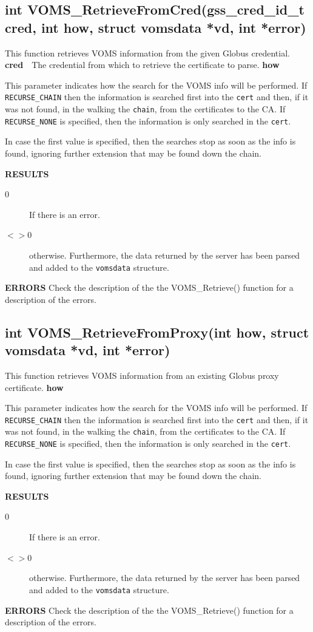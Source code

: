 \documentclass[a4paper]{book}
\newcommand{\errors}{\noindent \textbf{ERRORS}\newline}
\newcommand{\result}{\noindent \textbf{RESULTS}\newline}
\newcommand{\parameter}[1]{\newline\textbf{#1}\ \ }
\begin{document}
\subsection{int VOMS\_RetrieveFromCred(gss\_cred\_id\_t cred, int how, struct vomsdata
  *vd, int *error)}

This function retrieves VOMS information from the given Globus
credential.
\parameter{cred}{The credential from which to retrieve the certificate
  to parse.}
\parameter{how}{This parameter indicates how the search for the VOMS
  info will be performed.  If \verb|RECURSE_CHAIN| then the
  information is searched first into the \verb|cert| and then, if it
  was not found, in the walking the \verb|chain|, from the
  certificates to the CA.  If \verb|RECURSE_NONE| is specified, then
  the information is only searched in the \verb|cert|.

  In case the first value is specified, then the searches stop as soon
  as the info is found, ignoring further extension that may be found
  down the chain.}

\result
\begin{description}
\item[0] If there is an error.
\item[$<>$0] otherwise.  Furthermore, the data returned by the server
  has been parsed and added to the \verb|vomsdata| structure.
\end{description}

\errors
Check the description of the the VOMS\_Retrieve() function for a
description of the errors.

\subsection{int VOMS\_RetrieveFromProxy(int how, struct vomsdata *vd, int *error)}

This function retrieves VOMS information from an existing Globus proxy
certificate.
\parameter{how}{This parameter indicates how the search for the VOMS
  info will be performed.  If \verb|RECURSE_CHAIN| then the
  information is searched first into the \verb|cert| and then, if it
  was not found, in the walking the \verb|chain|, from the
  certificates to the CA.  If \verb|RECURSE_NONE| is specified, then
  the information is only searched in the \verb|cert|.

  In case the first value is specified, then the searches stop as soon
  as the info is found, ignoring further extension that may be found
  down the chain.}

\result
\begin{description}
\item[0] If there is an error.
\item[$<>$0] otherwise.  Furthermore, the data returned by the server
  has been parsed and added to the \verb|vomsdata| structure.
\end{description}

\errors
Check the description of the the VOMS\_Retrieve() function for a
description of the errors.
\end{document}
